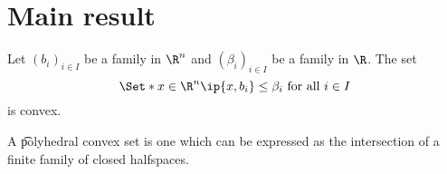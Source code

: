
\section*{Main result}

Let $(b_i)_{i \in I}$ be a family in $\R ^n$ and $(\beta _i)_{i \in I}$ be a family in $\R $. The set
\[
\Set*{x \in \R ^n}{\ip{x,b_i} \leq \beta _i \text{ for all } i \in I}
\]
is convex.

A \t{polyhedral} convex set is one which can be expressed as the intersection of a finite family of closed halfspaces.

\blankpage